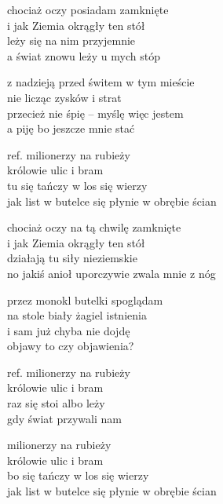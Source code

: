\begin{text}
    chociaż oczy posiadam zamknięte\\
    i jak Ziemia okrągły ten stół\\
    leży się na nim przyjemnie\\
    a świat znowu leży u mych stóp

    z nadzieją przed świtem w tym mieście\\
    nie licząc zysków i strat\\
    przecież nie śpię – myślę więc jestem\\
    a piję bo jeszcze mnie stać

    ref. milionerzy na rubieży\\
    królowie ulic i bram\\
    tu się tańczy w los się wierzy\\
    jak list w butelce się płynie w obrębie ścian

    chociaż oczy na tą chwilę zamknięte\\
    i jak Ziemia okrągły ten stół\\
    działają tu siły nieziemskie\\
    no jakiś anioł uporczywie zwala mnie z nóg

    przez monokl butelki spoglądam\\
    na stole biały żagiel istnienia\\
    i sam już chyba nie dojdę\\
    objawy to czy objawienia?

    ref. milionerzy na rubieży\\
    królowie ulic i bram\\
    raz się stoi albo leży\\
    gdy świat przywali nam

    milionerzy na rubieży\\
    królowie ulic i bram\\
    bo się tańczy w los się wierzy\\
    jak list w butelce się płynie w obrębie ścian
\end{text}
\begin{chord}

\end{chord}